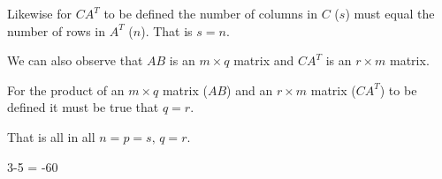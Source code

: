 Likewise for $CA^T$ to be defined the number of columns in $C$ ($s$) must equal the number of rows in $A^T$ ($n$). That is $s = n$.

We can also observe that $AB$ is an $m \times q$ matrix and $CA^T$ is an $r \times m$ matrix.

For the product of an $m \times q$ matrix ($AB$) and an $r \times m$ matrix ($CA^T$) to be defined it must be true that $q = r$.

That is all in all $n = p = s, \, q = r$.

3-5 = -60

